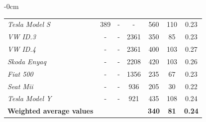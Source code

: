 \documentclass[journal,article,submit,pdftex,moreauthors]{Definitions/mdpi}
\begin{document}
\begin{table}[H]
\begin{adjustwidth}{-\extralength}{0cm}
{\begin{tabular}{@{}lcccccc@{}}
\textit{Tesla Model S}           & 389        & -          & -          & 560                     & 110                                                                                                   & 0.23                                                                                            \\
\textit{VW ID.3}                  & -          & -          & 2361       & 350                     & 85                                                                                                    & 0.23                                                                                            \\
\textit{VW ID.4}                  & -          & -          & 2361       & 400                     & 103                                                                                                   & 0.27                                                                                            \\
\textit{Skoda Enyaq}             & -          & -          & 2208       & 420                     & 103                                                                                                   & 0.26                                                                                            \\
\textit{Fiat 500}                & -          & -          & 1356       & 235                     & 67                                                                                                    & 0.23                                                                                            \\
\textit{Seat Mii}                & -          & -          & 936        & 205                     & 30                                                                                                    & 0.22                                                                                            \\
\textit{Tesla Model Y}           & -          & -          & 921        & 435                     & 108                                                                                                   & 0.24                                                                                            \\ \midrule
\textbf{Weighted average values} &            &            &            & \textbf{340}            & \textbf{81}                                                                                           & \textbf{0.24}                                                                                   \\ \bottomrule
\end{tabular}%
}
\end{adjustwidth}
\end{table}
\end{document}
